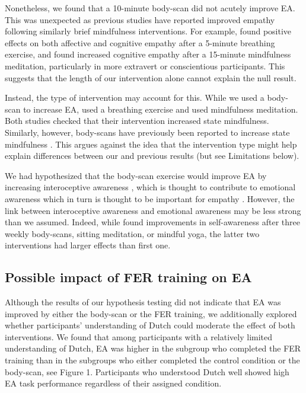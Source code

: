\documentclass[authordate, empirical]{jote-new-article}
\begin{document}
	Nonetheless, we found that a 10-minute body-scan did not acutely improve EA. This was unexpected as previous studies have reported improved empathy following similarly brief mindfulness interventions. For example, \textcite{Tan2014} found positive effects on both affective and cognitive empathy after a 5-minute breathing exercise, and \textcite{Winning2015} found increased cognitive empathy after a 15-minute mindfulness meditation, particularly in more extravert or conscientious participants. This suggests that the length of our intervention alone cannot explain the null result.



	Instead, the type of intervention may account for this. While we used a body-scan to increase EA, \textcite{Tan2014} used a breathing exercise and \textcite{Winning2015} used mindfulness meditation. Both studies checked that their intervention increased state mindfulness. Similarly, however, body-scans have previously been reported to increase state mindfulness \parencites{Upton2019}. This argues against the idea that the intervention type might help explain differences between our and previous results (but see Limitations below).



	We had hypothesized that the body-scan exercise would improve EA by increasing interoceptive awareness \parencites{Fischer2017}, which is thought to contribute to emotional awareness which in turn is thought to be important for empathy \parencites{Cuff2016}{Gallup2002}. However, the link between interoceptive awareness and emotional awareness may be less strong than we assumed. Indeed, while \textcite{Sauer-Zavala2013} found improvements in self-awareness after three weekly body-scans, sitting meditation, or mindful yoga, the latter two interventions had larger effects than first one.



	\subsection{Possible impact of FER training on EA}



	Although the results of our hypothesis testing did not indicate that EA was improved by either the body-scan or the FER training, we additionally explored whether participants' understanding of Dutch could moderate the effect of both interventions. We found that among participants with a relatively limited understanding of Dutch, EA was higher in the subgroup who completed the FER training than in the subgroups who either completed the control condition or the body-scan, see Figure 1. Participants who understood Dutch well showed high EA task performance regardless of their assigned condition.
\end{document}
